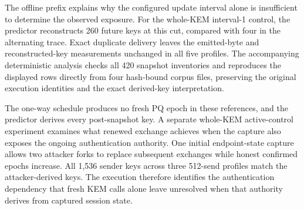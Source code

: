 The offline prefix explains why the configured update interval alone is
insufficient to determine the observed exposure. For the whole-KEM
interval-1 control, the predictor reconstructs 260 future keys at this cut,
compared with four in the alternating trace. Exact duplicate delivery leaves
the emitted-byte and reconstructed-key measurements unchanged in all five
profiles. The accompanying deterministic analysis checks all 420 snapshot
inventories and reproduces the displayed rows directly from four hash-bound
corpus files, preserving the original execution identities and the exact
derived-key interpretation.

The one-way schedule produces no fresh PQ epoch in these references, and
the predictor derives every post-snapshot key. A separate whole-KEM
active-control experiment examines what renewed exchange achieves when
the capture also exposes the ongoing authentication authority. One initial
endpoint-state capture allows two attacker forks to replace subsequent
exchanges while honest confirmed epochs increase. All 1,536 sender keys
across three 512-send profiles match the attacker-derived keys. The
execution therefore identifies the authentication dependency that fresh
KEM calls alone leave unresolved when that authority derives from captured
session state.






